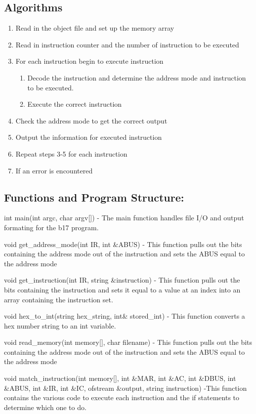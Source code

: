 \documentclass[11pt]{article}
\begin{document}
\subsection{Algorithms}
\begin{enumerate}
\item Read in the object file and set up the memory array
\item Read in instruction counter and the number of instruction to be executed
\item For each instruction  begin to execute instruction
\begin{enumerate}\item Decode the instruction and determine the address mode and instruction to be executed.
\item Execute the correct instruction \end{enumerate}
\item Check the address mode to get the correct output
\item Output the information for executed instruction 
\item Repeat steps 3-5 for each instruction
\item If an error is encountered 
\end{enumerate}

\subsection{Functions and Program Structure:}
int main(int argc, char\* argv[]) - The main function handles file I/O and output formating for the b17 program.

void get\_address\_mode(int IR, int \&ABUS) - This function pulls out the bits containing the address mode out of the  instruction and sets the ABUS equal to the address mode

void get\_instruction(int IR, string \&instruction) - This function pulls out the bits containing the instruction and sets it equal to a value at an index into an array containing the instruction set.

void hex\_to\_int(string hex\_string, int\& stored\_int) - This function converts a hex number string to an int variable.

void read\_memory(int memory[],  char\* filename) - This function pulls out the bits containing the address mode out of the  instruction and sets the ABUS equal to the address mode

void match\_instruction(int memory[], int \&MAR, int \&AC, int \&DBUS,  int \&ABUS, int \&IR, int \&IC,  ofstream \&output, string instruction) -This function contains the various code to execute each instruction and the if statements to determine which one to do.
\end{document}
